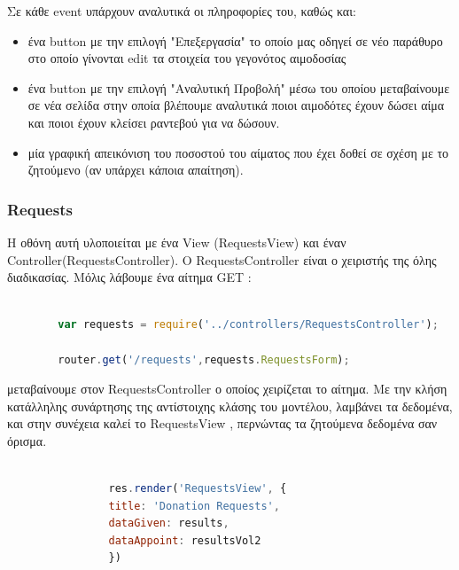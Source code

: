 		Σε κάθε event υπάρχουν αναλυτικά οι πληροφορίες του, καθώς και:
		
		\begin{itemize}
		\item ένα button με την επιλογή "Επεξεργασία" το οποίο μας οδηγεί σε νέο παράθυρο στο οποίο γίνονται edit τα στοιχεία του γεγονότος αιμοδοσίας
		
		\item ένα button με την επιλογή "Αναλυτική Προβολή" μέσω του οποίου μεταβαίνουμε σε νέα σελίδα στην οποία βλέπουμε αναλυτικά ποιοι αιμοδότες έχουν δώσει αίμα και ποιοι έχουν κλείσει ραντεβού για να δώσουν.
		
		\item μία γραφική απεικόνιση του ποσοστού του αίματος που έχει δοθεί σε σχέση με το ζητούμενο (αν υπάρχει κάποια απαίτηση).
		
		\end{itemize}
		

		
				\subsubsection{Requests}
		
	Η οθόνη αυτή υλοποιείται με ένα View (RequestsView) και έναν Controller(RequestsController). O RequestsController είναι ο χειριστής της όλης διαδικασίας. Μόλις λάβουμε ένα αίτημα GET :
		
		\begin{lstlisting}[language=Javascript]			
		
		var requests = require('../controllers/RequestsController');
		
		router.get('/requests',requests.RequestsForm);  


		\end{lstlisting}
		
μεταβαίνουμε στον RequestsController ο οποίος χειρίζεται το αίτημα. Με την κλήση κατάλληλης συνάρτησης της αντίστοιχης κλάσης του μοντέλου, λαμβάνει τα δεδομένα,  και στην συνέχεια καλεί το RequestsView , περνώντας τα ζητούμενα δεδομένα σαν όρισμα.



		\begin{lstlisting}[language=Javascript]			
		
	            res.render('RequestsView', { 
                title: 'Donation Requests',
                dataGiven: results,
                dataAppoint: resultsVol2
                })
                
		\end{lstlisting}
		
